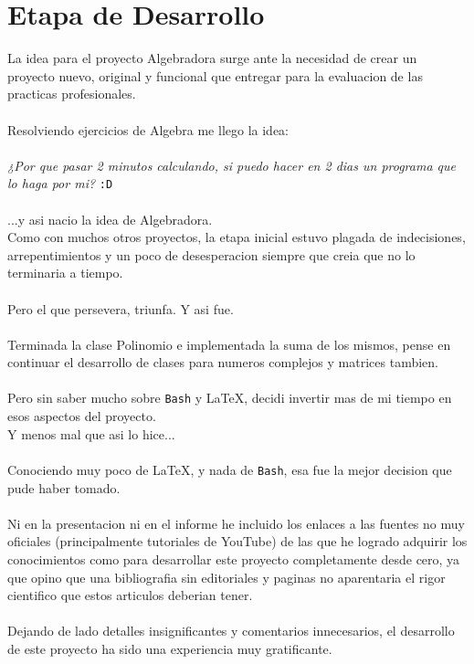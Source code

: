 \documentclass{article}
\begin{document}
\section{Etapa de Desarrollo}
La idea para el proyecto Algebradora surge ante la necesidad de crear un proyecto nuevo, original y funcional que entregar para la evaluacion de las practicas profesionales.\\\\
Resolviendo ejercicios de Algebra me llego la idea:\\\\
\textit{¿Por que pasar 2 minutos calculando, si puedo hacer en 2 dias un programa que lo haga por mi?} \verb|:D|\\\\
...y asi nacio la idea de Algebradora.\\
Como con muchos otros proyectos, la etapa inicial estuvo plagada de indecisiones, arrepentimientos y un poco de desesperacion siempre que creia que no lo terminaria a tiempo.\\\\
Pero el que persevera, triunfa. Y asi fue.\\\\
Terminada la clase Polinomio e implementada la suma de los mismos, pense en continuar el desarrollo de clases para numeros complejos y matrices tambien.\\\\
Pero sin saber mucho sobre \verb|Bash| y \LaTeX, decidi invertir mas de mi tiempo en esos aspectos del proyecto.\\
Y menos mal que asi lo hice...\\\\
Conociendo muy poco de \LaTeX, y nada de \verb|Bash|, esa fue la mejor decision que pude haber tomado.\\\\
Ni en la presentacion ni en el informe he incluido los enlaces a las fuentes no muy oficiales (principalmente tutoriales de YouTube) de las que he logrado adquirir los conocimientos como para desarrollar este proyecto completamente desde cero, ya que opino que una bibliografia sin editoriales y paginas no aparentaria el rigor cientifico que estos articulos deberian tener.\\\\
Dejando de lado detalles insignificantes y comentarios innecesarios, el desarrollo de este proyecto ha sido una experiencia muy gratificante.\\\\
\end{document}
